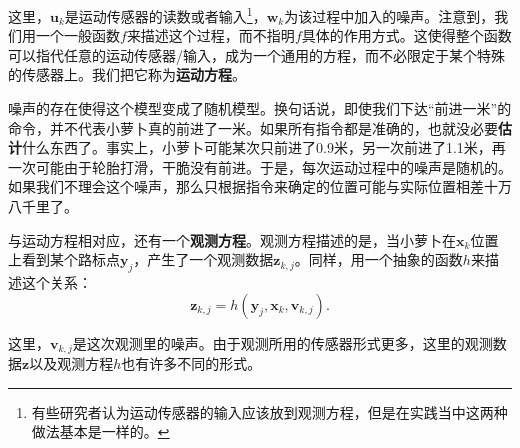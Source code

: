 这里，$\bm{u}_k$是运动传感器的读数或者输入\footnote{有些研究者认为运动传感器的输入应该放到观测方程，但是在实践当中这两种做法基本是一样的。}，$\bm{w}_k$为该过程中加入的噪声。注意到，我们用一个一般函数$f$来描述这个过程，而不指明$f$具体的作用方式。这使得整个函数可以指代任意的运动传感器/输入，成为一个通用的方程，而不必限定于某个特殊的传感器上。我们把它称为\textbf{运动方程}。

噪声的存在使得这个模型变成了随机模型。换句话说，即使我们下达“前进一米”的命令，并不代表小萝卜真的前进了一米。如果所有指令都是准确的，也就没必要\textbf{估计}什么东西了。事实上，小萝卜可能某次只前进了0.9米，另一次前进了1.1米，再一次可能由于轮胎打滑，干脆没有前进。于是，每次运动过程中的噪声是随机的。如果我们不理会这个噪声，那么只根据指令来确定的位置可能与实际位置相差十万八千里了。

与运动方程相对应，还有一个\textbf{观测方程}。观测方程描述的是，当小萝卜在$\bm{x}_k$位置上看到某个路标点$\bm{y}_j$，产生了一个观测数据$\bm{z}_{k,j}$。同样，用一个抽象的函数$h$来描述这个关系：
\begin{equation}
{\bm{z}_{k,j}} = h\left( {{\bm{y}_j},{\bm{x}_k}, \bm{v}_{k,j} } \right).
\end{equation}

这里，$\bm{v}_{k,j}$是这次观测里的噪声。由于观测所用的传感器形式更多，这里的观测数据$\bm{z}$以及观测方程$h$也有许多不同的形式。

